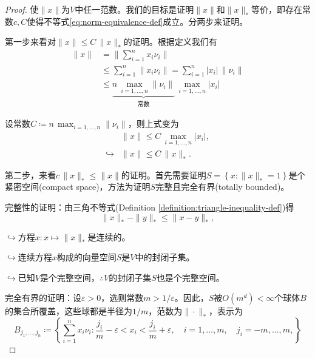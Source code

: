 \begin{proof}
  使$\| x \|$为$V$中任一范数。我们的目标是证明$  \| x \|$和$  \| x \|_{*}$等价，即存在常数$c,C$使得不等式\eqref{eq:norm-equivalence-def}成立。分两步来证明。

  第一步来看对$\|x\| \le C \, \|x\|_{*}$的证明。根据定义我们有
  \begin{equation*}
    \begin{split}
      \| x \| &= \big\| \sum_{i=1}^n x_i \nu_i \big\| \\
      &\le \sum_{i=1}^{n} \big\| x_i \nu_i \big\| =\sum_{i=1}^{n} \left| x_i \right| \, \| \nu_i \| \\
      &\le \underbrace{n \, \max_{i=1,\ldots,n} \| \nu_i \|}_{\text{常数}} \, \max_{i=1,\ldots,n} \left| x_i \right|
    \end{split}
  \end{equation*}

设常数$C \coloneqq n \, \max_{i=1,\ldots,n} \| \nu_i \|$，则上式变为
\begin{equation*}
  \begin{split}
    &\| x \| \le C \, \max_{i=1,\ldots,n} \left| x_i \right|, \\
    \hookrightarrow & \| x \| \le C \, \| x \|_{*}.
  \end{split}
\end{equation*}

第二步，来看$c \, \| x \|_{*} \le \| x \|$的证明。首先需要证明$S=\left\{ x: \| x \|_{*}=1 \right\}$是个紧密空间(compact space)，方法为证明$S$完整且完全有界(totally bounded)。

完整性的证明：由三角不等式(Definition \ref{definition:triangle-inequality-def})得
\begin{equation*}
  \| x \|_{*} - \| y \|_{*} \le \| x-y \|_{*},
\end{equation*}

$\hookrightarrow$方程$x:x \mapsto \|x\|_{*}$是连续的。

$\hookrightarrow$连续方程$x$构成的向量空间$S$是$V$中的封闭子集。

$\hookrightarrow$已知$V$是个完整空间，$\therefore V$的封闭子集$S$也是个完整空间。

完全有界的证明：设$\varepsilon >0$，选则常数$m > 1/\varepsilon$。因此，$S$被$O(m^d) < \infty$个球体$B$的集合所覆盖，这些球都是半径为$1/m$，范数为$\| \cdot \|_{*}$，表示为
\begin{equation*}
  B_{j_1,\ldots,j_n} \coloneqq \left\{
  \sum_{i=1}^{n} x_i \nu_i : \frac{j_i}{m}-\varepsilon < x_i < \frac{j_i}{m} + \varepsilon, \quad i=1,\ldots,m, \quad j_i = -m, \ldots,m,
  \right\}
\end{equation*}


\end{proof}
